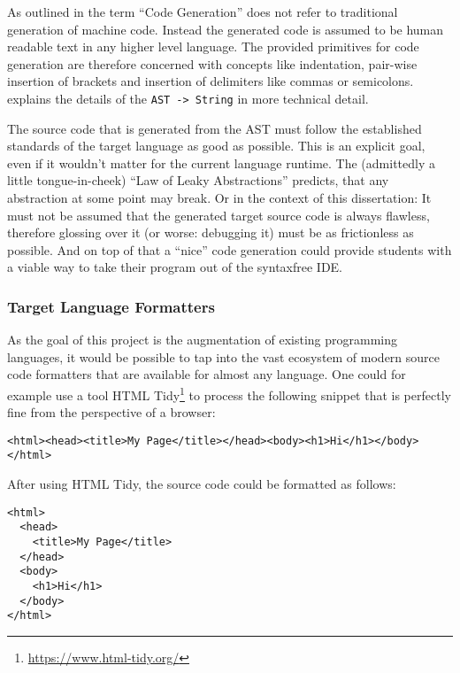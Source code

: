 As outlined in  the term \enquote{Code Generation} does not refer to traditional generation of machine code. Instead the generated code is assumed to be human readable text in any higher level language. The provided primitives for code generation are therefore concerned with concepts like indentation, pair-wise insertion of brackets and insertion of delimiters like commas or semicolons.  explains the details of the \texttt{AST -> String} in more technical detail.

The source code that is generated from the AST must follow the established standards of the target language as good as possible. This is an explicit goal, even if it wouldn't matter for the current language runtime. The (admittedly a little tongue-in-cheek) \enquote{Law of Leaky Abstractions} \cite{spolsky_law_2002} predicts, that any abstraction at some point may break. Or in the context of this dissertation: It must not be assumed that the generated target source code is always flawless, therefore glossing over it (or worse: debugging it) must be as frictionless as possible. And on top of that a \enquote{nice} code generation could provide students with a viable way to take their program out of the syntaxfree IDE.

\subsubsection{Target Language Formatters}

As the goal of this project is the augmentation of existing programming languages, it would be possible to tap into the vast ecosystem of modern source code formatters that are available for almost any language. One could for example use a tool HTML Tidy\footnote{\url{https://www.html-tidy.org/}} to process the following snippet that is perfectly fine from the perspective of a browser:

\begin{verbatim}
<html><head><title>My Page</title></head><body><h1>Hi</h1></body></html>
\end{verbatim}

After using HTML Tidy, the source code could be formatted as follows:

\begin{verbatim}
<html>
  <head>
    <title>My Page</title>
  </head>
  <body>
    <h1>Hi</h1>
  </body>
</html>
\end{verbatim}

